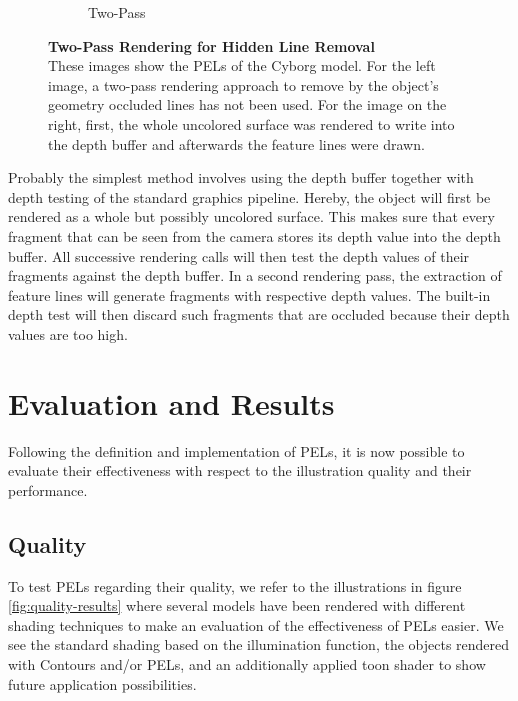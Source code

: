 \documentclass[9pt,fleqn,twoside,twocolumn]{stdglobal}
\begin{document}
\begin{figure}[h]
\begin{subfigure}[b]{0.49\linewidth}
        \caption{Two-Pass}
      \end{subfigure}
      \caption{%
        \textbf{Two-Pass Rendering for Hidden Line Removal}\\
        These images show the PELs of the Cyborg model.
        For the left image, a two-pass rendering approach to remove by the object's geometry occluded lines has not been used.
        For the image on the right, first, the whole uncolored surface was rendered to write into the depth buffer and afterwards the feature lines were drawn.
      }
      \label{fig:hidden-line-removal}
    \end{figure}

    Probably the simplest method involves using the depth buffer together with depth testing of the standard graphics pipeline.
    Hereby, the object will first be rendered as a whole but possibly uncolored surface.
    This makes sure that every fragment that can be seen from the camera stores its depth value into the depth buffer.
    All successive rendering calls will then test the depth values of their fragments against the depth buffer.
    In a second rendering pass, the extraction of feature lines will generate fragments with respective depth values.
    The built-in depth test will then discard such fragments that are occluded because their depth values are too high.


\section{Evaluation and Results}
  Following the definition and implementation of PELs, it is now possible to evaluate their effectiveness with respect to the illustration quality and their performance.

  \subsection{Quality}
    To test PELs regarding their quality, we refer to the illustrations in figure \ref{fig:quality-results} where several models have been rendered with different shading techniques to make an evaluation of the effectiveness of PELs easier.
    We see the standard shading based on the illumination function, the objects rendered with Contours and/or PELs, and an additionally applied toon shader to show future application possibilities.
\end{document}
